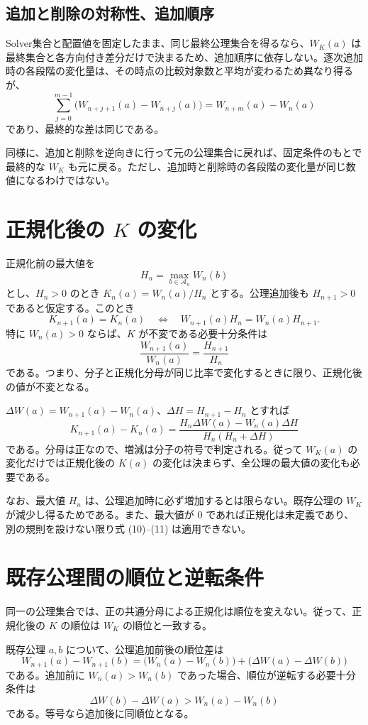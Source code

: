\subsection{追加と削除の対称性、追加順序}

Solver集合と配置値を固定したまま、同じ最終公理集合を得るなら、$W_K(a)$ は最終集合と各方向付き差分だけで決まるため、追加順序に依存しない。逐次追加時の各段階の変化量は、その時点の比較対象数と平均が変わるため異なり得るが、
\[
\sum_{j=0}^{m-1}\bigl(W_{n+j+1}(a)-W_{n+j}(a)\bigr)
=W_{n+m}(a)-W_n(a)
\]
であり、最終的な差は同じである。

同様に、追加と削除を逆向きに行って元の公理集合に戻れば、固定条件のもとで最終的な $W_K$ も元に戻る。ただし、追加時と削除時の各段階の変化量が同じ数値になるわけではない。

\section{正規化後の $K$ の変化}

正規化前の最大値を
\[
H_n=\max_{b\in\mathcal{A}_n}W_n(b)
\]
とし、$H_n>0$ のとき $K_n(a)=W_n(a)/H_n$ とする。公理追加後も $H_{n+1}>0$ であると仮定する。このとき
\[
K_{n+1}(a)=K_n(a)
\quad\Longleftrightarrow\quad
W_{n+1}(a)H_n=W_n(a)H_{n+1}.
\tag{10}
\]
特に $W_n(a)>0$ ならば、$K$ が不変である必要十分条件は
\[
\frac{W_{n+1}(a)}{W_n(a)}=\frac{H_{n+1}}{H_n}
\]
である。つまり、分子と正規化分母が同じ比率で変化するときに限り、正規化後の値が不変となる。

$\Delta W(a)=W_{n+1}(a)-W_n(a)$、$\Delta H=H_{n+1}-H_n$ とすれば
\[
\boxed{
K_{n+1}(a)-K_n(a)
=\frac{H_n\Delta W(a)-W_n(a)\Delta H}
{H_n(H_n+\Delta H)}
}
\tag{11}
\]
である。分母は正なので、増減は分子の符号で判定される。従って $W_K(a)$ の変化だけでは正規化後の $K(a)$ の変化は決まらず、全公理の最大値の変化も必要である。

なお、最大値 $H_n$ は、公理追加時に必ず増加するとは限らない。既存公理の $W_K$ が減少し得るためである。また、最大値が $0$ であれば正規化は未定義であり、別の規則を設けない限り式 (10)--(11) は適用できない。

\section{既存公理間の順位と逆転条件}

同一の公理集合では、正の共通分母による正規化は順位を変えない。従って、正規化後の $K$ の順位は $W_K$ の順位と一致する。

既存公理 $a,b$ について、公理追加前後の順位差は
\[
W_{n+1}(a)-W_{n+1}(b)
=\bigl(W_n(a)-W_n(b)\bigr)
+\bigl(\Delta W(a)-\Delta W(b)\bigr)
\tag{12}
\]
である。追加前に $W_n(a)>W_n(b)$ であった場合、順位が逆転する必要十分条件は
\[
\boxed{\Delta W(b)-\Delta W(a)>W_n(a)-W_n(b)}
\tag{13}
\]
である。等号なら追加後に同順位となる。

